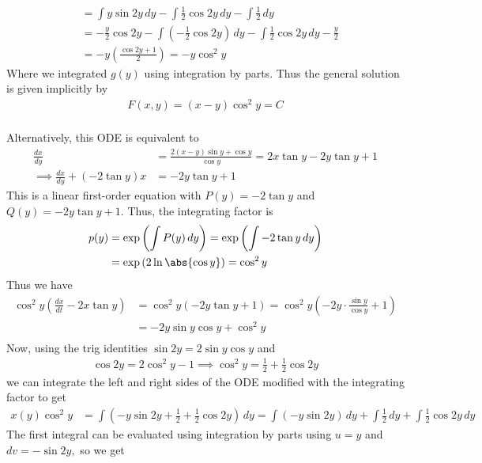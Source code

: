 \documentclass{article}
\begin{document}
\begin{enumerate}
\begin{soln}
\begin{align*}
				&= \int y\sin 2y\, dy - \int \frac{1}{2}\cos 2y\, dy - \int \frac{1}{2}\, dy \\
				&= -\frac{y}{2}\cos 2y - \int \left( -\frac{1}{2}\cos 2y \right)\, dy - \int \frac{1}{2}\cos 2y\, dy - \frac{y}{2} \\
				&= -y\left( \frac{\cos 2y + 1}{2} \right) = -y\cos^2 y
			\end{align*}
			Where we integrated $g(y)$ using integration by parts. Thus the general solution is given implicitly by
			\begin{align*}
				F(x, y) = \boxed{(x-y)\cos^2y = C} \\
			\end{align*}

			Alternatively, this ODE is equivalent to
			\begin{align*}
				\frac{dx}{dy} &= \frac{2(x-y)\sin y + \cos y}{\cos y} = 2x\tan y - 2y\tan y + 1 \\
				\implies \frac{dx}{dy} + (-2\tan y) x &= -2y\tan y + 1
			\end{align*}
			This is a linear first-order equation with $P(y)=-2\tan y$ and $Q(y) = -2y\tan y + 1.$ Thus, the integrating factor is
			\begin{align*}
				p(y) &= \exp\left( \int P(y)\, dy \right) = \exp\left( \int -2\tan y\, dy \right) \\ 
				&= \exp\left( 2\ln\abs{\cos y} \right)= \cos^2 y
			\end{align*}
			Thus we have
			\begin{align*}
				\cos^2 y \left( \frac{dx}{dt} -2x\tan y \right) &= \cos^2y \left( -2y\tan y+ 1 \right) = \cos^2y \left( -2y\cdot \frac{\sin y}{\cos y} + 1 \right) \\
				&= -2y\sin y\cos y + \cos^2y \\
			\end{align*}
			Now, using the trig identities $\sin 2y = 2\sin y\cos y$ and
			\begin{align*}
				\cos 2y = 2\cos^2y - 1 \implies \cos^2y = \frac{1}{2} + \frac{1}{2}\cos 2y
			\end{align*}
			we can integrate the left and right sides of the ODE modified with the integrating factor to get
			\begin{align*}
				x(y) \cos^2y &= \int\left( -y\sin 2y + \frac{1}{2} + \frac{1}{2}\cos 2y \right)\, dy = \int\left( -y\sin 2y \right)\, dy + \int \frac{1}{2}\, dy + \int \frac{1}{2}\cos 2y\, dy
			\end{align*}
			The first integral can be evaluated using integration by parts using $u=y$ and $dv=-\sin 2y,$ so we get 

\end{soln}
\end{enumerate}
\end{document}

